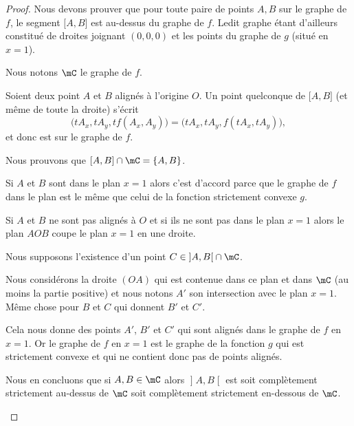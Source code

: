 \begin{proof}
	Nous devons prouver que pour toute paire de points \( A,B\) sur le graphe de \( f\), le segment \( \mathopen[ A , B \mathclose]\) est au-dessus du graphe de \( f\). Ledit graphe étant d'ailleurs constitué de droites joignant \( (0,0,0)\) et les points du graphe de \( g\) (situé en \( x=1\)).

	Nous notons \( \mC\) le graphe de \( f\).

	\begin{subproof}
		Soient deux point \( A\) et \( B\) alignés à l'origine \( O\). Un point quelconque de \( \mathopen[ A , B \mathclose]\) (et même de toute la droite) s'écrit
		\begin{equation}
			\big( tA_x,tA_y,tf(A_x,A_y) \big)=\big( tA_x,tA_y,f(tA_x,tA_y) \big),
		\end{equation}
		et donc est sur le graphe de \( f\).

		Nous prouvons que \( \mathopen[ A , B \mathclose]\cap \mC=\{ A,B \}\).

		Si \( A\) et \( B\) sont dans le plan \( x=1\) alors c'est d'accord parce que le graphe de \( f\) dans le plan est le même que celui de la fonction strictement convexe \( g\).

		Si \( A\) et \( B\) ne sont pas alignés à \( O\) et si ils ne sont pas dans le plan \( x=1\) alors le plan \( AOB\) coupe le plan \( x=1\) en une droite.

		Nous supposons l'existence d'un point \( C\in \mathopen] A , B \mathclose[\cap\mC\).

			Nous considérons la droite \( (OA)\) qui est contenue dans ce plan et dans \( \mC\) (au moins la partie positive) et nous notons \( A'\) son intersection avec le plan \( x=1\). Même chose pour \( B\) et \( C\) qui donnent \( B'\) et \( C'\).

			Cela nous donne des points \( A'\), \( B'\) et \( C'\) qui sont alignés dans le graphe de \( f\) en \( x=1\). Or le graphe de \( f\) en \( x=1\) est le graphe de la fonction \( g\) qui est strictement convexe et qui ne contient donc pas de points alignés.

			Nous en concluons que si \( A,B\in\mC\) alors \( \mathopen] A , B \mathclose[\) est soit complètement strictement au-dessus de \( \mC\) soit complètement strictement en-dessous de \( \mC\).

	\end{subproof}


\end{proof}
